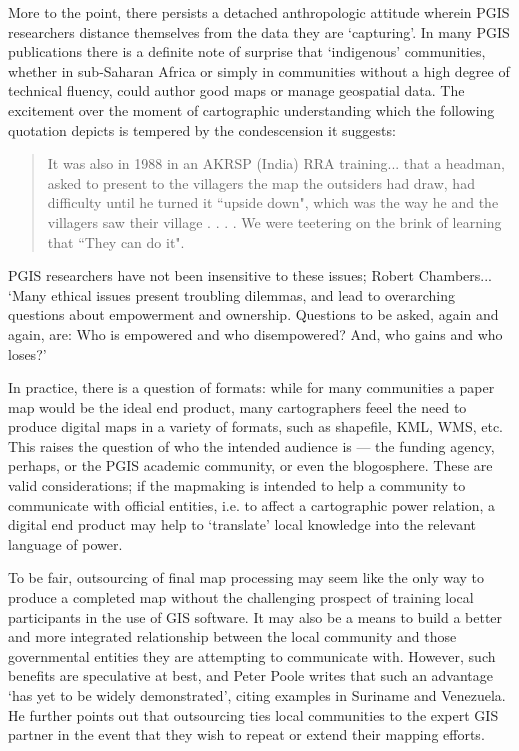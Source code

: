 \documentclass[11pt,oneside,notitlepage]{report}
\begin{document}
More to the point, there persists a detached anthropologic attitude wherein \ac{PGIS} researchers distance themselves from the data they are `capturing'. In many \ac{PGIS} publications there is a definite note of surprise that `indigenous' communities, whether in sub-Saharan Africa or simply in communities without a high degree of technical fluency, could author good maps or manage geospatial data. The excitement over the moment of cartographic understanding which the following quotation depicts is tempered by the condescension it suggests: 

\begin{quote}
It was also in 1988 in an AKRSP (India) RRA training... that a headman, asked to present to the villagers the map the outsiders had draw, had difficulty until he turned it ``upside down", which was the way he and the villagers saw their village . . . . We were teetering on the brink of learning that ``They can do it".
\cite{chambers2006participatory}
\end{quote}

\ac{PGIS} researchers have not been insensitive to these issues; Robert Chambers...  `Many ethical issues present troubling dilemmas, and lead to overarching questions about empowerment and ownership. Questions to be asked, again and again, are: Who is empowered and who disempowered? And, who gains and who loses?' \cite{chambers2006whose}

In practice, there is a question of formats: while for many communities a paper map would be the ideal end product, many cartographers feeel the need to produce digital maps in a variety of formats, such as shapefile, \ac{KML}, \ac{WMS}, etc. This raises the question of who the intended audience is --- the funding agency, perhaps, or the \ac{PGIS} academic community, or even the blogosphere. These are valid considerations; if the mapmaking is intended to help a community to communicate with official entities, i.e. to affect a cartographic power relation, a digital end product may help to `translate' local knowledge into the relevant language of power. 

To be fair, outsourcing of final map processing may seem like the only way to produce a completed map without the challenging prospect of training local participants in the use of GIS software. It may also be a means to build a better and more integrated relationship between the local community and those governmental entities they are attempting to communicate with. However, such benefits are speculative at best, and Peter Poole writes that such an advantage `has yet to be widely demonstrated', citing examples in Suriname and Venezuela. He further points out that outsourcing ties local communities to the expert GIS partner in the event that they wish to repeat or extend their mapping efforts. \cite{poole2006there}
\end{document}
